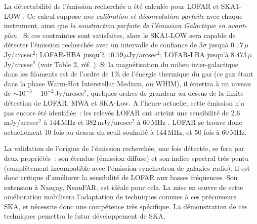 \pg
La d\'etectabilit\'e de l'\'emission recherch\'ee a \'et\'e calcul\'ee pour LOFAR et SKA1-LOW \cite{2015A&A...580A.119V}. Ce calcul suppose \textit{une calibration et d\'econvolution parfaite} avec chaque instrument, ainsi que \textit{la soustraction parfaite de l'\'emission Galactique en avant-plan} \cite{2015MNRAS.447.1973B}. %
Si ces contraintes sont satisfaites, alors le SKA1-LOW sera capable de d\'etecter l'\'emission recherch\'ee avec un intervalle de confiance de $3\sigma$ jusqu\`a $0.17$\,$\mu$Jy/arcsec$^2$; LOFAR-HBA jusqu'\`a $10.59$\,$\mu$Jy/arcsec$^2$; LOFAR-LBA jusqu'\`a $8.473$\,$\mu$Jy/arcsec$^2$ (voir Table 2, r\'ef.   \cite{2015A&A...580A.119V}). 
Si la magn\'etisation du milieu inter-galactique dans les filaments est de l'ordre de 1\% de l'\'energie thermique du gaz (ce gaz \'etant dans la phase Warm-Hot Interstellar Medium, ou WHIM), il \'emettra \`a un niveau de $\sim 10^{-3}-10^{-2}$\,Jy/arcsec$^2$, quelques ordres de grandeur au-dessus de la limite d\'etection de LOFAR, MWA et SKA-Low. %
A l'heure actuelle, cette \'emission n'a pas encore \'et\'e identifi\'ee~: les relev\'es LOFAR ont atteint une sensibilit\'e de $2.6$\,mJy/arcsec$^2$ \`a 144\,MHz \cite{2022A&A...659A...1S} et $382$\,mJy/arcsec$^2$ \`a 60\,MHz \cite{2023A&A...673A.165D}. LOFAR se trouve donc actuellement 10 fois au-dessus du seuil souhait\'e \`a 144\,MHz, et 50 fois \`a 60\,MHz.

\pg
La validation de l'origine de l'\'emission recherch\'ee, une fois d\'etect\'ee, se fera par deux propri\'et\'es~: son \'etendue (\'emission diffuse) et son indice spectral tr\`es pentu (compl\'etement incompatible avec l'\'emission synchrotron de galaxies radio). Il est donc critique d'am\'eliorer la sensibilit\'e de LOFAR aux basses fr\'equences. Son extension \`a Nan\c{c}ay, NenuFAR, est id\'eale pour cela. La mise en {\oe}uvre de cette am\'elioration mobilisera l'adaptation de techniques connues \`a ces pr\'ecurseurs SKA, et n\'ecessite donc une comp\'etence tr\`es sp\'ecifique. La d\'emonstration de ces techniques pemettra le futur d\'eveloppement de SKA.


